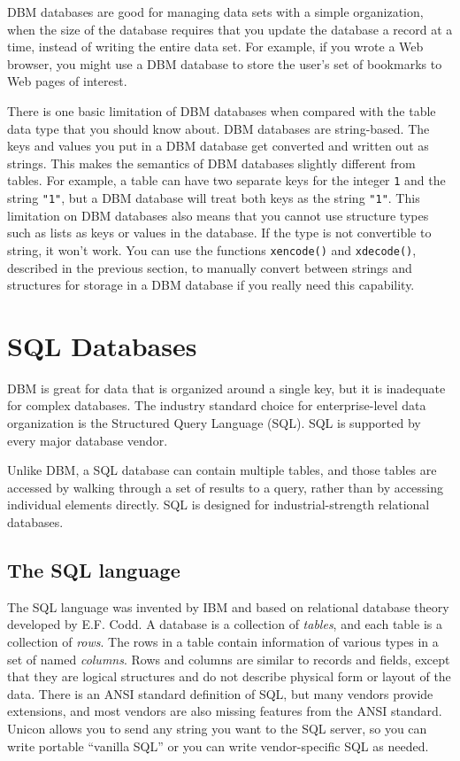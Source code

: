 DBM databases are good for managing data sets with a simple
organization, when the size of the database requires that you update
the database a record at a time, instead of writing the entire data
set. For example, if you wrote a Web browser, you might use a DBM
database to store the user's set of bookmarks to Web
pages of interest.

There is one basic limitation of DBM databases when compared with the
table data type that you should know about. DBM databases are
string-based. The keys and values you put in a DBM database get
converted and written out as strings. This makes the semantics of DBM
databases slightly different from tables. For example, a table can have
two separate keys for the integer \texttt{1} and the string
\texttt{"1"}, but a DBM database will treat
both keys as the string \texttt{"1"}. This
limitation on DBM databases also means that you cannot use structure
types such as lists as keys or values in the database. If the type is
not convertible to string, it won't work. You can use
the functions \texttt{xencode()} and \texttt{xdecode()}, described in
the previous section, to manually convert between strings and
structures for storage in a DBM database if you really need this
capability.

\section[SQL Databases]{SQL Databases}

DBM is great for data that is organized around a single
key, but it is inadequate for complex databases. The industry
standard choice for enterprise-level data organization is the
Structured Query Language (SQL). SQL is supported by every major
database vendor.

Unlike DBM, a SQL database can contain
multiple tables, and those tables are accessed by walking through a set
of results to a query, rather than by accessing individual elements
directly. SQL is designed for industrial-strength relational databases.

\subsection{The SQL language}

The SQL language was invented by IBM and based on relational database
theory developed by E.F. Codd. A database is a collection of
\textit{tables}, and each table is a collection of \textit{rows}. The
rows in a table contain information of various types in a set of named
\textit{columns}. Rows and columns are similar to records and fields,
except that they are logical structures and do not describe physical
form or layout of the data. There is an ANSI standard definition of
SQL, but many vendors provide extensions, and most vendors are also
missing features from the ANSI standard. Unicon allows you to send any
string you want to the SQL server, so you can write portable
``vanilla SQL'' or you can write vendor-specific SQL as needed.

